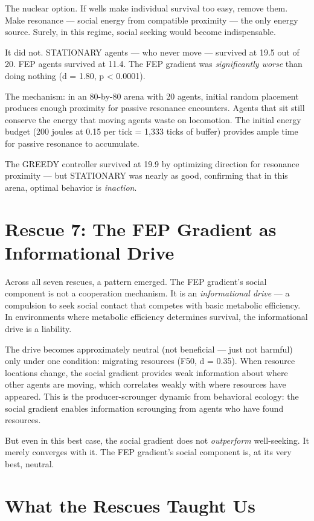 The nuclear option. If wells make individual survival too easy, remove them. Make resonance --- social energy from compatible proximity --- the only energy source. Surely, in this regime, social seeking would become indispensable.

It did not. STATIONARY agents --- who never move --- survived at 19.5 out of 20. FEP agents survived at 11.4. The FEP gradient was \emph{significantly worse} than doing nothing (d = 1.80, p \textless{} 0.0001).

The mechanism: in an 80-by-80 arena with 20 agents, initial random placement produces enough proximity for passive resonance encounters. Agents that sit still conserve the energy that moving agents waste on locomotion. The initial energy budget (200 joules at 0.15 per tick = 1,333 ticks of buffer) provides ample time for passive resonance to accumulate.

The GREEDY controller survived at 19.9 by optimizing direction for resonance proximity --- but STATIONARY was nearly as good, confirming that in this arena, optimal behavior is \emph{inaction}.

\section{Rescue 7: The FEP Gradient as Informational Drive}\label{rescue-7-the-fep-gradient-as-informational-drive}

Across all seven rescues, a pattern emerged. The FEP gradient's social component is not a cooperation mechanism. It is an \emph{informational drive} --- a compulsion to seek social contact that competes with basic metabolic efficiency. In environments where metabolic efficiency determines survival, the informational drive is a liability.

The drive becomes approximately neutral (not beneficial --- just not harmful) only under one condition: migrating resources (F50, d = 0.35). When resource locations change, the social gradient provides weak information about where other agents are moving, which correlates weakly with where resources have appeared. This is the producer-scrounger dynamic from behavioral ecology: the social gradient enables information scrounging from agents who have found resources.

But even in this best case, the social gradient does not \emph{outperform} well-seeking. It merely converges with it. The FEP gradient's social component is, at its very best, neutral.

\section{What the Rescues Taught Us}\label{what-the-rescues-taught-us}

